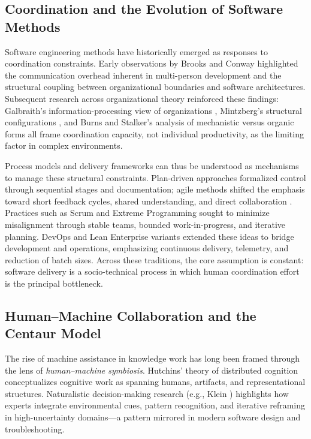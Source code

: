 \documentclass[11pt, a4paper, twocolumn]{article} %
\begin{document}
\subsection*{Coordination and the Evolution of Software Methods}

Software engineering methods have historically emerged as responses to
coordination constraints. Early observations by Brooks \citep{brooks1995mythical}
and Conway \citep{conway1968how} highlighted the communication overhead inherent
in multi-person development and the structural coupling between organizational
boundaries and software architectures. Subsequent research across organizational
theory reinforced these findings: Galbraith's information-processing view of
organizations \citep{galbraith1974}, Mintzberg's structural configurations
\citep{mintzberg1979}, and Burns and Stalker's analysis of mechanistic versus
organic forms \citep{burnsstalker1961} all frame coordination capacity, not
individual productivity, as the limiting factor in complex environments.

Process models and delivery frameworks can thus be understood as mechanisms to
manage these structural constraints. Plan-driven approaches formalized control
through sequential stages and documentation; agile methods shifted the emphasis
toward short feedback cycles, shared understanding, and direct collaboration
\citep{cockburn2001,highsmith2002agile}. Practices such as Scrum
\citep{schwaber2017scrum} and Extreme Programming \citep{beck1999xp} sought to
minimize misalignment through stable teams, bounded work-in-progress, and
iterative planning. DevOps and Lean Enterprise variants
\citep{humble2015leanenterprise,forsgren2018accelerate} extended these ideas to
bridge development and operations, emphasizing continuous delivery, telemetry,
and reduction of batch sizes. Across these traditions, the core assumption is
constant: software delivery is a socio-technical process in which human
coordination effort is the principal bottleneck.

\subsection*{Human--Machine Collaboration and the Centaur Model}

The rise of machine assistance in knowledge work has long been framed through
the lens of \emph{human--machine symbiosis}. Hutchins' theory of distributed
cognition \citep{hutchins1995} conceptualizes cognitive work as spanning humans,
artifacts, and representational structures. Naturalistic decision-making
research (e.g., Klein \citep{klein2008}) highlights how experts integrate
environmental cues, pattern recognition, and iterative reframing in
high-uncertainty domains---a pattern mirrored in modern software design and
troubleshooting.
\end{document}
